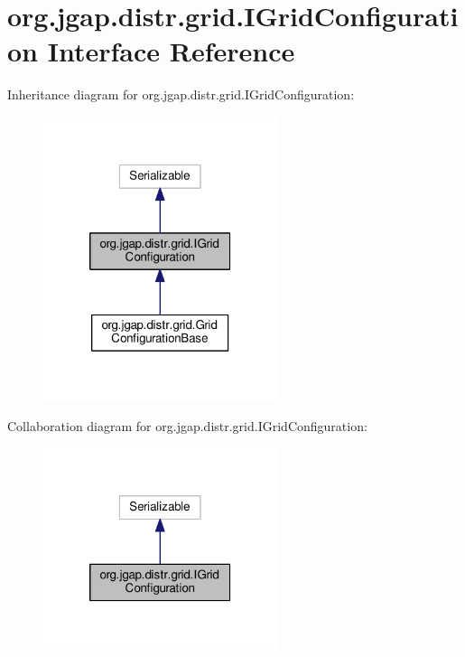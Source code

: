 \hypertarget{interfaceorg_1_1jgap_1_1distr_1_1grid_1_1_i_grid_configuration}{\section{org.\-jgap.\-distr.\-grid.\-I\-Grid\-Configuration Interface Reference}
\label{interfaceorg_1_1jgap_1_1distr_1_1grid_1_1_i_grid_configuration}
}


Inheritance diagram for org.\-jgap.\-distr.\-grid.\-I\-Grid\-Configuration\-:
\nopagebreak
\begin{figure}[H]
\begin{center}
\leavevmode
\includegraphics[width=194pt]{interfaceorg_1_1jgap_1_1distr_1_1grid_1_1_i_grid_configuration__inherit__graph}
\end{center}
\end{figure}


Collaboration diagram for org.\-jgap.\-distr.\-grid.\-I\-Grid\-Configuration\-:
\nopagebreak
\begin{figure}[H]
\begin{center}
\leavevmode
\includegraphics[width=194pt]{interfaceorg_1_1jgap_1_1distr_1_1grid_1_1_i_grid_configuration__coll__graph}
\end{center}
\end{figure}
